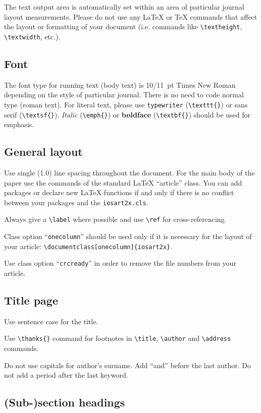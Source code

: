 \documentclass[ao]{iosart2x}
\begin{document}
The text output area is automatically set within an area of particular journal layout measurements.
Please do not use any
\LaTeX{} or \TeX{} commands that affect the layout or formatting of
your document (i.e. commands like \verb|\textheight|,
\verb|\textwidth|, etc.).

\subsection{Font}

The font type for running text (body text) is 10/11~pt Times New Roman
depending on the style of particular journal.
There is no need to code normal type (roman text). For literal text, please use
\texttt{type\-writer} (\verb|\texttt{}|)
or \textsf{sans serif} (\verb|\textsf{}|). \emph{Italic} (\verb|\emph{}|)
or \textbf{boldface} (\verb|\textbf{}|) should be used for emphasis.


\subsection{General layout}

Use single (1.0) line spacing throughout the document. For the main
body of the paper use the commands of the standard \LaTeX{}
``article'' class. You can add packages or declare new \LaTeX{}
functions if and only if there is no conflict between your packages
and the \texttt{iosart2x.cls}.

Always give a \verb|\label| where possible and use \verb|\ref| for cross-referencing.

Class option ``\texttt{onecolumn}'' should be used only if it is
necessary for the layout of your article:\hfill\break
\verb|\documentclass[onecolumn]{iosart2x}|.

Use class option ``\texttt{crcready}'' in order to remove the file numbers from your article.


\subsection{Title page}

Use sentence case for the title.

Use \verb|\thanks{}| command for footnotes in \verb|\title|,
\verb|\author| and \verb|\address| commands.

Do not use capitals for author's surname. Add ``and'' before the last
author. Do not add a period after the last keyword.


\subsection{(Sub-)section headings}
\end{document}
